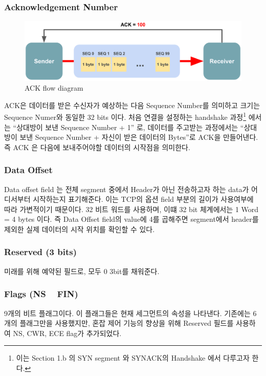     \subsubsection*{Acknowledgement Number}
        \vspace{-4mm}  
        \begin{figure}[!h]\centering
    		\includegraphics[width=.7\textwidth]{image/week01/1-1-2.png}
    		\caption{\small ACK flow diagram}
    		\vspace{-10pt}
        \end{figure}
    	ACK은 데이터를 받은 수신자가 예상하는 다음 Sequence Number를 의미하고 크기는 Sequence Numer와 동일한 32 bits 이다. 
    	처음 연결을 설정하는 handshake 과정\footnote{이는 Section 1.b 의 SYN segment 와 SYNACK의 Handshake 에서 다루고자 한다. }
    	에서는 “상대방이 보낸 Sequence Number + 1” 로, 데이터를 주고받는 과정에서는 
    	“상대방이 보낸 Sequence Number + 자신이 받은 데이터의 Bytes”로 ACK을 만들어낸다.
    	즉 ACK 은 다음에 보내주어야할 데이터의 시작점을 의미한다. 
    \subsubsection*{Data Offset}\label{sec:data offset}
        Data offset field 는 전체 segment 중에서 Header가 아닌 전송하고자 하는 data가 어디서부터 시작하는지 표기해준다. 
        이는 TCP의 옵션 field 부분의 길이가 사용여부에 따라 가변적이기 때문이다. 
        32 비트 워드를 사용하며, 이떄 32 bit 체계에서는 1 Word = 4 bytes 이다. 
        즉 Data Offset field의 value에 4를 곱해주면 segment에서 header를 제외한 실제 데이터의 시작 위치를  확인할 수 있다.
    \subsubsection*{Reserved (3 bits)}\label{sec:reserved}
        미래를 위해 예약된 필드로, 모두 0 3bit를 채워준다.
    \subsubsection*{Flags (NS ~ FIN)}   
        9개의 비트 플래그이다. 이 플래그들은 현재 세그먼트의 속성을 나타낸다. 
        기존에는 6개의 플래그만을 사용했지만, 혼잡 제어 기능의 향상을 위해 Reserved 필드를 사용하여 NS, CWR, ECE flag가 추가되었다.
        
